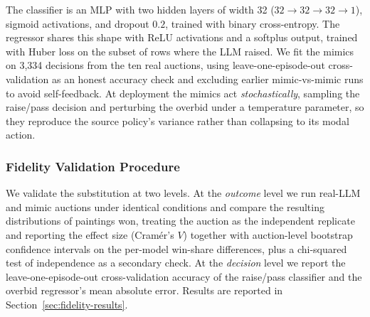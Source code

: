The classifier is an MLP with two hidden layers of width 32 ($32\!\to\!32\!\to\!32\!\to\!1$), sigmoid activations, and dropout $0.2$, trained with binary cross-entropy. The regressor shares this shape with ReLU activations and a softplus output, trained with Huber loss on the subset of rows where the LLM raised. We fit the mimics on 3{,}334 decisions from the ten real auctions, using leave-one-episode-out cross-validation as an honest accuracy check and excluding earlier mimic-vs-mimic runs to avoid self-feedback. At deployment the mimics act \emph{stochastically}, sampling the raise/pass decision and perturbing the overbid under a temperature parameter, so they reproduce the source policy's variance rather than collapsing to its modal action.

\subsubsection{Fidelity Validation Procedure}
We validate the substitution at two levels. At the \emph{outcome} level we run real-LLM and mimic auctions under identical conditions and compare the resulting distributions of paintings won, treating the auction as the independent replicate and reporting the effect size (Cram\'er's $V$) together with auction-level bootstrap confidence intervals on the per-model win-share differences, plus a chi-squared test of independence as a secondary check. At the \emph{decision} level we report the leave-one-episode-out cross-validation accuracy of the raise/pass classifier and the overbid regressor's mean absolute error. Results are reported in Section~\ref{sec:fidelity-results}.

